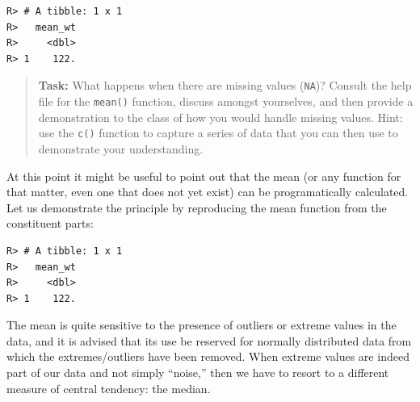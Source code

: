 \documentclass[english,10pt,a4paper,oneside]{book}
\newenvironment{Shaded}{\begin{snugshade}}{\end{snugshade}}
\newcommand{\KeywordTok}[1]{\textcolor[rgb]{0.13,0.29,0.53}{\textbf{#1}}}
\newcommand{\DataTypeTok}[1]{\textcolor[rgb]{0.13,0.29,0.53}{#1}}
\newcommand{\DecValTok}[1]{\textcolor[rgb]{0.00,0.00,0.81}{#1}}
\newcommand{\StringTok}[1]{\textcolor[rgb]{0.31,0.60,0.02}{#1}}
\newcommand{\CommentTok}[1]{\textcolor[rgb]{0.56,0.35,0.01}{\textit{#1}}}
\newcommand{\OperatorTok}[1]{\textcolor[rgb]{0.81,0.36,0.00}{\textbf{#1}}}
\newcommand{\NormalTok}[1]{#1}
\theoremstyle{definition}
\theoremstyle{definition}
\theoremstyle{definition}
\theoremstyle{remark}
\begin{document}
\begin{Shaded}
\end{Shaded}

\begin{verbatim}
R> # A tibble: 1 x 1
R>   mean_wt
R>     <dbl>
R> 1    122.
\end{verbatim}

\begin{quote}
\textbf{Task:} What happens when there are missing values (\texttt{NA})?
Consult the help file for the \texttt{mean()} function, discuss amongst
yourselves, and then provide a demonstration to the class of how you
would handle missing values. Hint: use the \texttt{c()} function to
capture a series of data that you can then use to demonstrate your
understanding.
\end{quote}

At this point it might be useful to point out that the mean (or any
function for that matter, even one that does not yet exist) can be
programatically calculated. Let us demonstrate the principle by
reproducing the mean function from the constituent parts:

\begin{Shaded}
\end{Shaded}

\begin{verbatim}
R> # A tibble: 1 x 1
R>   mean_wt
R>     <dbl>
R> 1    122.
\end{verbatim}

The mean is quite sensitive to the presence of outliers or extreme
values in the data, and it is advised that its use be reserved for
normally distributed data from which the extremes/outliers have been
removed. When extreme values are indeed part of our data and not simply
\enquote{noise,} then we have to resort to a different measure of
central tendency: the median.
\end{document}
